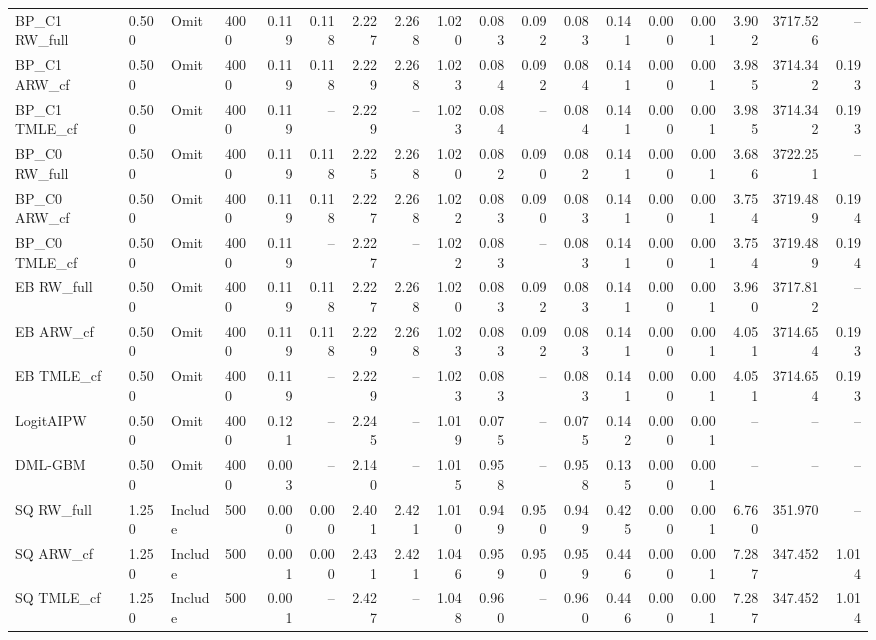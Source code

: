 \begin{tabular}{llllrrrrrrrrrrrrrr}
BP\_C1 RW\_full & 0.500 & Omit & 4000 & 0.119 & 0.118 & 2.227 & 2.268 & 1.020 & 0.083 & 0.092 & 0.083 & 0.141 & 0.000 & 0.001 & 3.902 & 3717.526 & -- \\
BP\_C1 ARW\_cf & 0.500 & Omit & 4000 & 0.119 & 0.118 & 2.229 & 2.268 & 1.023 & 0.084 & 0.092 & 0.084 & 0.141 & 0.000 & 0.001 & 3.985 & 3714.342 & 0.193 \\
BP\_C1 TMLE\_cf & 0.500 & Omit & 4000 & 0.119 & -- & 2.229 & -- & 1.023 & 0.084 & -- & 0.084 & 0.141 & 0.000 & 0.001 & 3.985 & 3714.342 & 0.193 \\
BP\_C0 RW\_full & 0.500 & Omit & 4000 & 0.119 & 0.118 & 2.225 & 2.268 & 1.020 & 0.082 & 0.090 & 0.082 & 0.141 & 0.000 & 0.001 & 3.686 & 3722.251 & -- \\
BP\_C0 ARW\_cf & 0.500 & Omit & 4000 & 0.119 & 0.118 & 2.227 & 2.268 & 1.022 & 0.083 & 0.090 & 0.083 & 0.141 & 0.000 & 0.001 & 3.754 & 3719.489 & 0.194 \\
BP\_C0 TMLE\_cf & 0.500 & Omit & 4000 & 0.119 & -- & 2.227 & -- & 1.022 & 0.083 & -- & 0.083 & 0.141 & 0.000 & 0.001 & 3.754 & 3719.489 & 0.194 \\
EB RW\_full & 0.500 & Omit & 4000 & 0.119 & 0.118 & 2.227 & 2.268 & 1.020 & 0.083 & 0.092 & 0.083 & 0.141 & 0.000 & 0.001 & 3.960 & 3717.812 & -- \\
EB ARW\_cf & 0.500 & Omit & 4000 & 0.119 & 0.118 & 2.229 & 2.268 & 1.023 & 0.083 & 0.092 & 0.083 & 0.141 & 0.000 & 0.001 & 4.051 & 3714.654 & 0.193 \\
EB TMLE\_cf & 0.500 & Omit & 4000 & 0.119 & -- & 2.229 & -- & 1.023 & 0.083 & -- & 0.083 & 0.141 & 0.000 & 0.001 & 4.051 & 3714.654 & 0.193 \\
LogitAIPW & 0.500 & Omit & 4000 & 0.121 & -- & 2.245 & -- & 1.019 & 0.075 & -- & 0.075 & 0.142 & 0.000 & 0.001 & -- & -- & -- \\
DML-GBM & 0.500 & Omit & 4000 & 0.003 & -- & 2.140 & -- & 1.015 & 0.958 & -- & 0.958 & 0.135 & 0.000 & 0.001 & -- & -- & -- \\
SQ RW\_full & 1.250 & Include & 500 & 0.000 & 0.000 & 2.401 & 2.421 & 1.010 & 0.949 & 0.950 & 0.949 & 0.425 & 0.000 & 0.001 & 6.760 & 351.970 & -- \\
SQ ARW\_cf & 1.250 & Include & 500 & 0.001 & 0.000 & 2.431 & 2.421 & 1.046 & 0.959 & 0.950 & 0.959 & 0.446 & 0.000 & 0.001 & 7.287 & 347.452 & 1.014 \\
SQ TMLE\_cf & 1.250 & Include & 500 & 0.001 & -- & 2.427 & -- & 1.048 & 0.960 & -- & 0.960 & 0.446 & 0.000 & 0.001 & 7.287 & 347.452 & 1.014 \\

\end{tabular}
